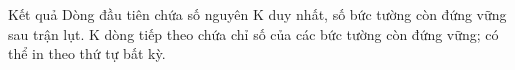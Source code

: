 Kết quả  
Dòng đầu tiên chứa số nguyên K duy nhất, số bức tường còn đứng vững sau trận lụt. K dòng tiếp theo chứa chỉ số của các bức tường còn đứng vững; có thể in theo thứ tự bất kỳ.